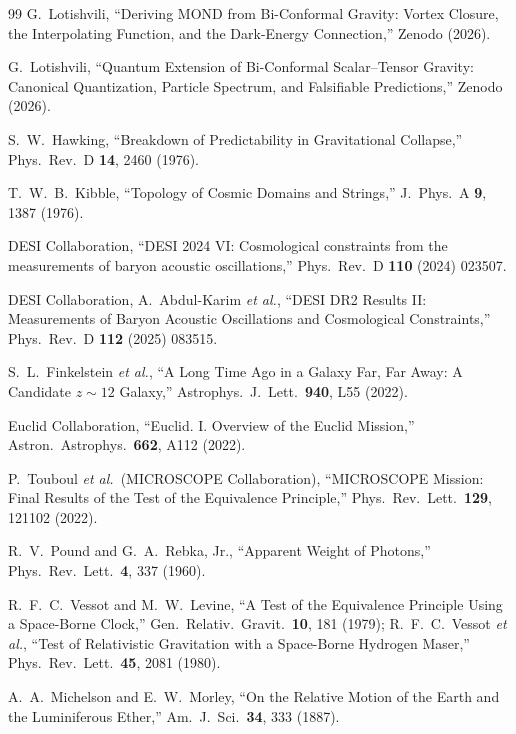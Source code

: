 \begin{thebibliography}{99}
G.~Lotishvili,
``Deriving MOND from Bi-Conformal Gravity: Vortex Closure, the Interpolating Function, and the Dark-Energy Connection,''
Zenodo (2026).

G.~Lotishvili,
``Quantum Extension of Bi-Conformal Scalar--Tensor Gravity: Canonical Quantization, Particle Spectrum, and Falsifiable Predictions,''
Zenodo (2026).

S.~W.~Hawking,
``Breakdown of Predictability in Gravitational Collapse,''
Phys.\ Rev.\ D \textbf{14}, 2460 (1976).

T.~W.~B.~Kibble,
``Topology of Cosmic Domains and Strings,''
J.\ Phys.\ A \textbf{9}, 1387 (1976).

DESI Collaboration,
``DESI 2024 VI: Cosmological constraints from the measurements
of baryon acoustic oscillations,''
Phys.\ Rev.\ D \textbf{110} (2024) 023507.

DESI Collaboration, A.~Abdul-Karim \textit{et al.},
``DESI DR2 Results II: Measurements of Baryon Acoustic
Oscillations and Cosmological Constraints,''
Phys.\ Rev.\ D \textbf{112} (2025) 083515.

S.~L.~Finkelstein \textit{et al.},
``A Long Time Ago in a Galaxy Far, Far Away: A Candidate $z \sim 12$ Galaxy,''
Astrophys.\ J.\ Lett.\ \textbf{940}, L55 (2022).

Euclid Collaboration,
``Euclid. I. Overview of the Euclid Mission,''
Astron.\ Astrophys.\ \textbf{662}, A112 (2022).

P.~Touboul \textit{et al.}\ (MICROSCOPE Collaboration),
``MICROSCOPE Mission: Final Results of the Test of the Equivalence Principle,''
Phys.\ Rev.\ Lett.\ \textbf{129}, 121102 (2022).

R.~V.~Pound and G.~A.~Rebka, Jr.,
``Apparent Weight of Photons,''
Phys.\ Rev.\ Lett.\ \textbf{4}, 337 (1960).

R.~F.~C.~Vessot and M.~W.~Levine,
``A Test of the Equivalence Principle Using a Space-Borne Clock,''
Gen.\ Relativ.\ Gravit.\ \textbf{10}, 181 (1979);
R.~F.~C.~Vessot \textit{et al.},
``Test of Relativistic Gravitation with a Space-Borne Hydrogen Maser,''
Phys.\ Rev.\ Lett.\ \textbf{45}, 2081 (1980).

A.~A.~Michelson and E.~W.~Morley,
``On the Relative Motion of the Earth and the Luminiferous Ether,''
Am.\ J.\ Sci.\ \textbf{34}, 333 (1887).


\end{thebibliography}
